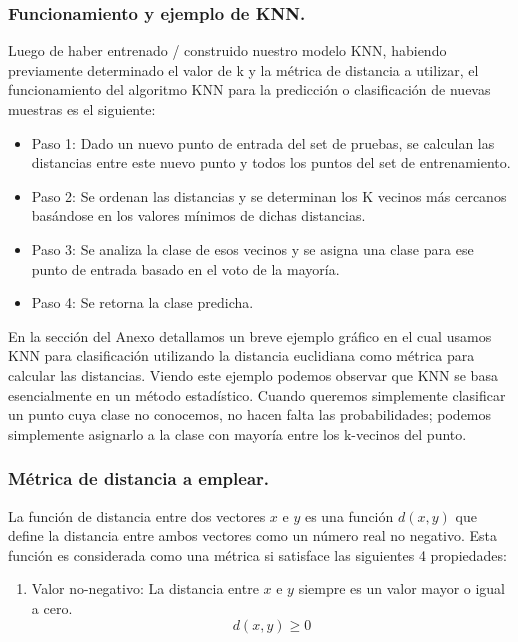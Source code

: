 \documentclass[12pt,a4paper]{article}
\begin{document}
\begin{sloppypar}
\subsubsection{Funcionamiento y ejemplo de KNN.}

Luego de haber entrenado / construido nuestro modelo KNN, habiendo previamente determinado el valor de k y la métrica de distancia a utilizar, el funcionamiento del algoritmo KNN para la predicción o clasificación de nuevas muestras es el siguiente: 

\begin{itemize}
\item Paso 1: Dado un nuevo punto de entrada del set de pruebas, se calculan las distancias entre este nuevo punto y todos los puntos del set de entrenamiento.
\item Paso 2: Se ordenan las distancias y se determinan los K vecinos más cercanos basándose en los valores mínimos de dichas distancias.
\item Paso 3: Se analiza la clase de esos vecinos y se asigna una clase para ese punto de entrada basado en el voto de la mayoría.
\item Paso 4: Se retorna la clase predicha.
\end{itemize}

En la sección del Anexo \textit{} detallamos un breve ejemplo gráfico en el cual usamos KNN para clasificación utilizando la distancia euclidiana como métrica para calcular las distancias. Viendo este ejemplo podemos observar que KNN se basa esencialmente en un método estadístico. Cuando queremos simplemente clasificar un punto cuya clase no conocemos, no hacen falta las probabilidades; podemos simplemente asignarlo a la clase con mayoría entre los k-vecinos del punto.

\cleardoublepage

\subsubsection{Métrica de distancia a emplear.}\label{metrica_dist_emp}

La función de distancia entre dos vectores $x$ e $y$ es una función $d(x,y)$ que define la distancia entre ambos vectores como un número real no negativo. Esta función es considerada como una métrica si satisface las siguientes 4 propiedades\cite{KNN_Ejemplo}: 

\begin{enumerate}
\item Valor no-negativo: La distancia entre $x$ e $y$ siempre es un valor mayor o igual a cero. 
$$d(x,y) \geq 0$$


\end{enumerate}
\end{sloppypar}
\end{document}
